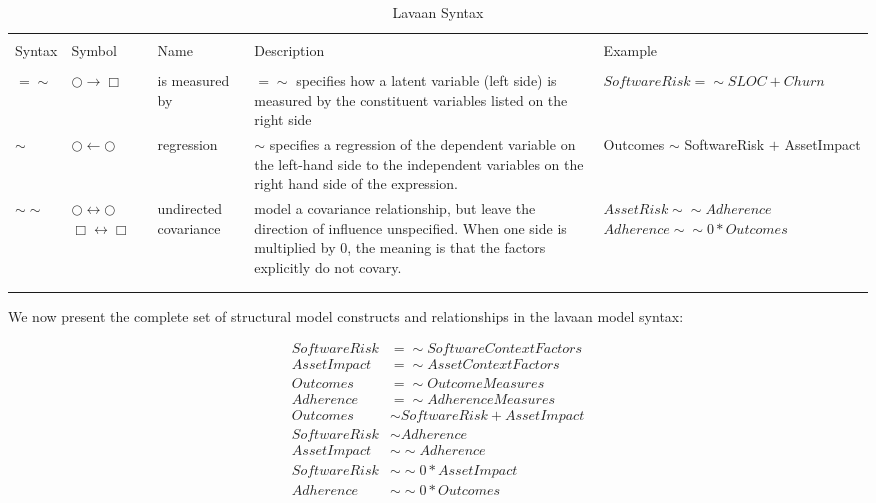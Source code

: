 \begin{table}[!htbp] \centering 
	\caption{Lavaan Syntax} 
	\label{tab:model_lavaan_syntax} 
	\begin{small}
		\begin{tabular}{p{.75cm}p{1.25cm}p{1.5cm}p{3.5cm}p{2.5cm}} 
			&&&&\\[-1.8ex]\hline 
			\hline&&&& \\[-1.8ex] 
			Syntax & Symbol & Name & Description & Example \\ 
			\hline &&&&\\[-1.8ex]  
			$=\sim$	& $\bigcirc \rightarrow \Box$ & is measured by & $=\sim$ specifies how a latent variable (left side) is measured by the constituent variables listed on the right side & $SoftwareRisk =\sim SLOC + Churn$\\	
			 $\sim$ & $\bigcirc \leftarrow \bigcirc$ & regression & $\sim$ specifies a regression of the dependent variable on the left-hand side to the independent variables on the right hand side of the expression. & Outcomes $\sim$ SoftwareRisk $+$ AssetImpact  \\	
			 $\sim\sim$ & $\bigcirc \leftrightarrow \bigcirc$ $\Box \leftrightarrow \Box$ & undirected covariance & model a covariance relationship, but leave the direction of influence unspecified. When one side is multiplied by 0, the meaning is that the factors  explicitly do not covary. & $AssetRisk \sim\sim Adherence$  $Adherence \sim\sim 0*Outcomes$\\
			\hline &&&&\\[-1.8ex] 
			\hline &&&&\\[-1.8ex] 
		\end{tabular} 
	\end{small}
\end{table} 
We now present the complete set of structural model constructs and relationships in the lavaan model syntax: 

 \begin{equation} \label{eq:1}
 \begin{split}
 SoftwareRisk &=\sim SoftwareContextFactors\\ 
  AssetImpact &=\sim AssetContextFactors\\
  Outcomes &=\sim OutcomeMeasures\\
  Adherence &=\sim AdherenceMeasures\\
  Outcomes &\sim SoftwareRisk + AssetImpact\\
   SoftwareRisk &\sim Adherence\\
   AssetImpact &\sim\sim  Adherence\\
   SoftwareRisk &\sim\sim 0*AssetImpact\\
   Adherence &\sim\sim 0*Outcomes\\
 \end{split}
 \end{equation}     

